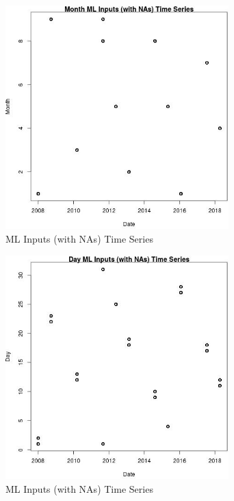 \begin{figure} 
\centering  
\includegraphics[width=0.77\textwidth]{Code_Outputs/Report_ML_input_PM25_Step4_part_e_de_duplicated_aves_compiled_2019-05-18wNAs_MonthvDate.jpg} 
\caption{\label{fig:Report_ML_input_PM25_Step4_part_e_de_duplicated_aves_compiled_2019-05-18wNAsMonthvDate}ML Inputs (with NAs) Time Series} 
\end{figure} 
 

\begin{figure} 
\centering  
\includegraphics[width=0.77\textwidth]{Code_Outputs/Report_ML_input_PM25_Step4_part_e_de_duplicated_aves_compiled_2019-05-18wNAs_DayvDate.jpg} 
\caption{\label{fig:Report_ML_input_PM25_Step4_part_e_de_duplicated_aves_compiled_2019-05-18wNAsDayvDate}ML Inputs (with NAs) Time Series} 
\end{figure} 
 


